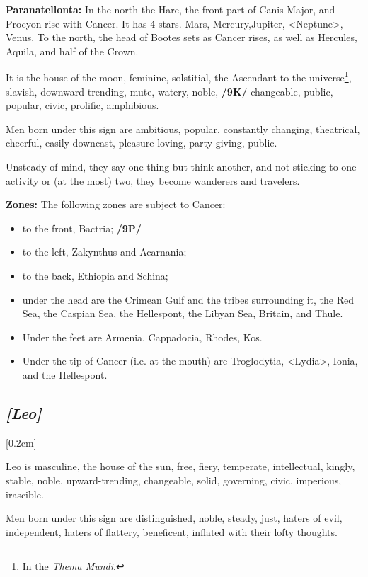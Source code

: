 \textbf{Paranatellonta:} In the north the Hare, the front part of Canis Major, and Procyon rise with Cancer. It has 4 stars. Mars, Mercury,Jupiter, <Neptune>, Venus. To the north, the head of Bootes sets as Cancer rises, as well as Hercules,
Aquila, and half of the Crown.

It is the house of the moon, feminine, solstitial, the Ascendant to the universe\footnote{In the \textit{Thema Mundi}.}, slavish, downward trending,
mute, watery, noble, \textbf{/9K/} changeable, public, popular, civic, prolific, amphibious. 

Men born under this sign are ambitious, popular, constantly changing, theatrical, cheerful, easily downcast, pleasure loving, party-giving, public. 

Unsteady of mind, they say one thing but think another, and not sticking to one activity or (at the most) two, they become wanderers and travelers.

\textbf{Zones:} The following zones are subject to Cancer: 
\begin{itemize}
\item to the front, Bactria; \textbf{/9P/}
\item to the left, Zakynthus and Acarnania; 
\item to the back, Ethiopia and Schina;
\item under the head are the Crimean Gulf and the tribes
surrounding it, the Red Sea, the Caspian Sea, the Hellespont, the Libyan Sea, Britain, and Thule. 
\item Under the feet are Armenia, Cappadocia, Rhodes, Kos. \item Under the tip of Cancer (i.e. at the mouth) are
Troglodytia, <Lydia>, Ionia, and the Hellespont.
\end{itemize}

\secbr
\subsection{\textit{[Leo]}}
[0.2cm]

Leo is masculine, the house of the sun, free, fiery, temperate, intellectual, kingly, stable, noble, upward-trending, changeable, solid, governing, civic, imperious, irascible.

Men born under this sign are distinguished, noble, steady, just, haters of evil, independent, haters of flattery, beneficent, inflated with their lofty thoughts. 

